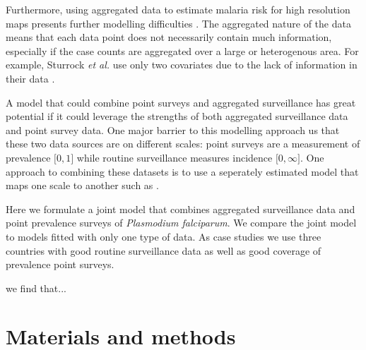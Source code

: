 \documentclass[10pt,letterpaper]{article}
\begin{document}

Furthermore, using aggregated data to estimate malaria risk for high resolution maps presents further modelling difficulties \cite{sturrock2014fine, wilson2017pointless, law2018variational, taylor2017continuous, li2012log}.
The aggregated nature of the data means that each data point does not necessarily contain much information, especially if the case counts are aggregated over a large or heterogenous area.
For example, Sturrock \emph{et al.} use only two covariates due to the lack of information in their data \cite{sturrock2014fine}.

A model that could combine point surveys and aggregated surveillance has great potential if it could leverage the strengths of both aggregated surveillance data and point survey data.
One major barrier to this modelling approach us that these two data sources are on different scales: point surveys are a measurement of prevalence $\lbrack 0, 1\rbrack$ while routine surveillance measures incidence $\lbrack 0, \infty\rbrack$.
One approach to combining these datasets is to use a seperately estimated model that maps one scale to another such as \cite{cameron2015defining}.


Here we formulate a joint model that combines aggregated surveillance data and point prevalence surveys of \emph{Plasmodium falciparum}.
We compare the joint model to models fitted with only one type of data.
As case studies we use three countries with good routine surveillance data as well as good coverage of prevalence point surveys.


we find that...


\section*{Materials and methods}
\end{document}
